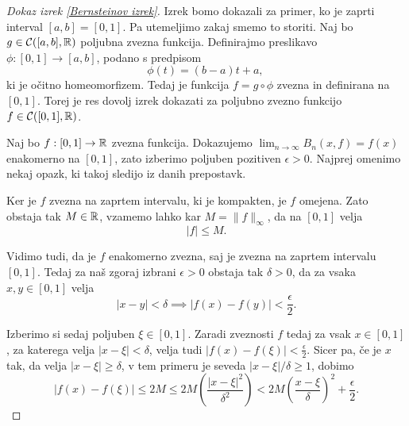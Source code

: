 \documentclass[a4paper, reqno]{amsart}
\theoremstyle{theorem}
\theoremstyle{definition}
\begin{document}
\begin{proof}[Dokaz \emph{izrek \ref{Bernsteinov izrek}}]


\par
Izrek bomo dokazali za primer, ko je zaprti interval $[a,b] = [0,1]$. Pa utemeljimo
zakaj smemo to storiti. Naj bo $g \in \mathcal{C}([a,b],\mathbb{R})$ poljubna zvezna funkcija. 
Definirajmo preslikavo $\phi: [0,1] \to [a,b]$, podano s predpisom
$$ \phi(t) = (b - a)t + a \text{, }$$
ki je očitno homeomorfizem. Tedaj je funkcija $f = g \circ \phi$ zvezna in definirana
na $[0,1]$. Torej je res dovolj izrek dokazati za poljubno zvezno funkcijo $f \in \mathcal{C}([0,1],\mathbb{R})$. 

\par
Naj bo $f : [0,1] \to \mathbb{R}$ zvezna funkcija. Dokazujemo $\lim_{n\to\infty}B_n(x, f) = f(x)$
enakomerno na $[0,1]$, zato izberimo poljuben pozitiven $\epsilon > 0$. Najprej
omenimo nekaj opazk, ki takoj sledijo iz danih prepostavk.

\par
Ker je $f$ zvezna na zaprtem intervalu, ki je kompakten, je $f$ omejena. %
Zato obstaja tak $M \in \mathbb{R}$, vzamemo lahko kar $M = \|f\|_{\infty}$, da na $[0,1]$ velja
$$ |f| \leq M \text{.}$$
\par
Vidimo tudi, da je $f$ enakomerno zvezna, saj je zvezna na zaprtem intervalu $[0,1]$.
Tedaj za naš zgoraj izbrani $\epsilon > 0$ obstaja tak $\delta > 0$, da za vsaka 
$x, y \in [0,1]$ velja
\begin{equation}
	\label{eq:enak.zv.}
	|x - y| < \delta \implies |f(x) - f(y)| < \frac{\epsilon}{2}\text{.}
\end{equation}

\par
Izberimo si sedaj poljuben $\xi \in [0,1]$. Zaradi zveznosti $f$ tedaj za vsak
$x \in [0,1]$, za katerega velja $|x - \xi| < \delta$, velja tudi 
$|f(x) - f(\xi)| < \frac{\epsilon}{2}$. Sicer pa, če je $x$ tak, da velja
$|x - \xi| \geq \delta$, v tem primeru je seveda $|x - \xi|/\delta \geq 1$, dobimo
\begin{equation}
	\label{eq:druga moznost}
	|f(x) - f(\xi)| \leq 2M \leq 2M\left(\frac{|x - \xi|^2}{\delta^2}\right) <
	2M\left(\frac{x - \xi}{\delta}\right)^2 + \frac{\epsilon}{2}\text{.}
\end{equation}


\end{proof}
\end{document}
